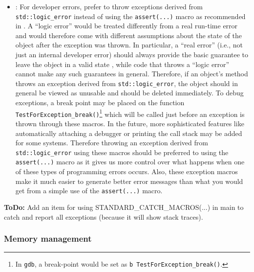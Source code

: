 \begin{itemize}

\item\GCGTestForException: For developer errors, prefer to throw
  exceptions derived from {}\texttt{std\-::logic\-\_error} instead of
  using the {}\texttt{assert(...)}  macro as recommended in
  {}\cite[Item 68]{C++CodingStandards05}.  A ``logic error'' would be
  treated differently from a real run-time error and would therefore
  come with different assumptions about the state of the object after
  the exception was thrown.  In particular, a ``real error'' (i.e.,
  not just an internal developer error) should always provide the
  basic guarantee to leave the object in a valid state \cite[Item
  71]{C++CodingStandards05}, while code that throws a ``logic error''
  cannot make any such guarantees in general.  Therefore, if an
  object's method throws an exception derived from
  \texttt{std\-::logic\-\_error}, the object should in general be
  viewed as unusable and should be deleted immediately.  To debug
  exceptions, a break point may be placed on the function
  {}\texttt{Test\-For\-Exception\-\_break()}\footnote{In
    {}\texttt{gdb}, a break-point would be set as {}\texttt{b
      Test\-For\-Exception\-\_break()}.} which will be called just
  before an exception is thrown through these macros.  In the future,
  more sophisticated features like automatically attaching a debugger
  or printing the call stack may be added for some systems.  Therefore
  throwing an exception derived from \texttt{std\-::logic\-\_error}
  using these macros should be preferred to using the
  {}\texttt{assert(...)} macro as it gives us more control over what
  happens when one of these types of programming errors occurs.  Also,
  these exception macros make it much easier to generate better error
  messages than what you would get from a simple use of the
  \texttt{assert(...)} macro.

\end{itemize}


{}\textbf{ToDo:} Add an item for using STANDARD\_CATCH\_MACROS(...) in
main to catch and report all exceptions (because it will show stack
traces).


%
\subsubsection{Memory management}
%


